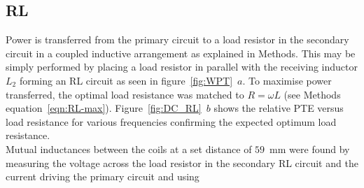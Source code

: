 \documentclass[11pt]{iopart}
\begin{document}
\subsection*{RL}
Power is transferred from the primary circuit to a load resistor in
the secondary circuit in a coupled inductive arrangement as explained
in Methods. This may be simply performed by placing a load resistor in
parallel with the receiving inductor $L_2$ forming an RL circuit as
seen in figure~\ref{fig:WPT}~$a$. To maximise power transferred, the
optimal load resistance was matched to $R = \omega L$ (see Methods
equation~\ref{eqn:RL-max}). Figure~\ref{fig:DC_RL}~$b$ shows the
relative PTE versus load resistance for various frequencies confirming
the expected optimum load resistance. \\ Mutual inductances between
the coils at a set distance of $59$~mm were found by measuring the
voltage across the load resistor in the secondary RL circuit and the
current driving the primary circuit and using
\end{document}
